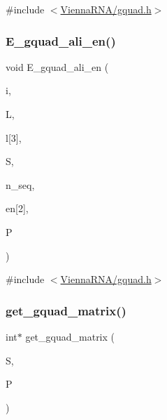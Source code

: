 {\ttfamily \#include $<$\mbox{\hyperlink{gquad_8h}{Vienna\+R\+N\+A/gquad.\+h}}$>$}

\mbox{\label{group__gquads_ga106bfd11a4c7a12c4ded9b32d31e78e9}} 
\subsubsection{\texorpdfstring{E\+\_\+gquad\+\_\+ali\+\_\+en()}{E\_gquad\_ali\_en()}}
{\footnotesize\ttfamily void E\+\_\+gquad\+\_\+ali\+\_\+en (\begin{DoxyParamCaption}\item[{int}]{i,  }\item[{int}]{L,  }\item[{int}]{l\mbox{[}3\mbox{]},  }\item[{const short $\ast$$\ast$}]{S,  }\item[{int}]{n\+\_\+seq,  }\item[{int}]{en\mbox{[}2\mbox{]},  }\item[{\mbox{\hyperlink{group__energy__parameters_ga8a69ca7d787e4fd6079914f5343a1f35}{vrna\+\_\+param\+\_\+t}} $\ast$}]{P }\end{DoxyParamCaption})}



{\ttfamily \#include $<$\mbox{\hyperlink{gquad_8h}{Vienna\+R\+N\+A/gquad.\+h}}$>$}

\mbox{\label{group__gquads_ga392e45c9615aa123737671603fa4203c}} 
\subsubsection{\texorpdfstring{get\+\_\+gquad\+\_\+matrix()}{get\_gquad\_matrix()}}
{\footnotesize\ttfamily int$\ast$ get\+\_\+gquad\+\_\+matrix (\begin{DoxyParamCaption}\item[{short $\ast$}]{S,  }\item[{\mbox{\hyperlink{group__energy__parameters_ga8a69ca7d787e4fd6079914f5343a1f35}{vrna\+\_\+param\+\_\+t}} $\ast$}]{P }\end{DoxyParamCaption})}



